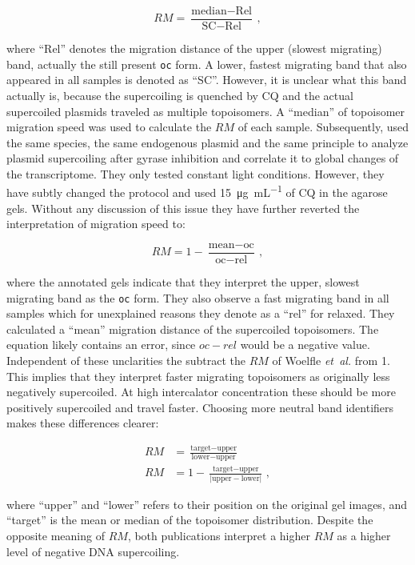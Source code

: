 \documentclass[10pt,a4]{article}
\newcommand{\ugml}{\micro\gram\per\milli\liter}
\newcommand{\etal}{\textit{et~al.}}
\begin{document}
\begin{equation}
  RM = \frac{\text{median} - \text{Rel}}{\text{SC} - \text{Rel}}\,,
\end{equation}

where ``Rel'' denotes the migration distance of the upper (slowest
migrating) band, actually the still present \texttt{oc} form.
A lower, fastest migrating band that also appeared in all samples
is denoted as ``SC''. However, it is unclear what this band actually
is, because the supercoiling is quenched by CQ and the actual
supercoiled plasmids traveled as multiple topoisomers. A ``median'' of
topoisomer migration speed was used to calculate the $RM$ of each sample.
%
Subsequently, \citet{Vijayan2009} used the same species,
the same endogenous plasmid and the same principle to analyze plasmid
supercoiling after gyrase inhibition and correlate it to global
changes of the transcriptome. They only tested constant light
conditions.  However, they have subtly changed the protocol and used
\SI{15}{\ugml} of CQ in the agarose gels. Without any discussion of
this issue they have further reverted the interpretation of migration
speed to:

\begin{equation}
  RM = 1 - \frac{\text{mean} - \text{oc}}{\text{oc} - \text{rel}}\,,
\end{equation}

where the annotated gels indicate that they interpret the upper, slowest
migrating band as the \texttt{oc} form. They also observe a fast
migrating band in all samples which for unexplained reasons they
denote as a ``rel'' for relaxed. They calculated a ``mean'' migration
distance of the supercoiled topoisomers. The equation likely contains
an error, since $oc-rel$ would be a negative value. Independent of
these unclarities the subtract the $RM$ of Woelfle \etal{} from
1. This implies that they interpret faster migrating topoisomers
as originally less negatively supercoiled. At high intercalator
concentration these should be more positively supercoiled and travel
faster.
%
Choosing more neutral band identifiers makes these
differences clearer:

\begin{align}
  RM &= \frac{\text{target} - \text{upper}}{\text{lower} - \text{upper}}\\
  RM &=1-\frac{\text{target} - \text{upper}}{\lvert \text{upper} - \text{lower} \rvert}\,,
\end{align}

where ``upper'' and ``lower'' refers to their position on the original
gel images, and ``target'' is the mean or median of the topoisomer
distribution.  Despite the opposite meaning of $RM$, both publications
interpret a higher $RM$ as a higher level of negative DNA
supercoiling.
 
\end{document}
